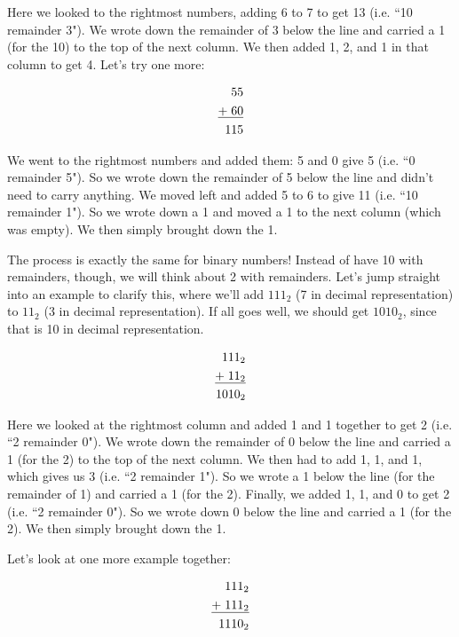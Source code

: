 Here we looked to the rightmost numbers, adding 6 to 7 to get 13 (i.e. ``10 remainder 3"). We wrote down the remainder of 3 below the line and carried a 1 (for the 10) to the top of the next column. We then added 1, 2, and 1 in that column to get 4. Let's try one more:

\begin{align*}
55&\\
\underline{+\hspace{1mm}60}&\\
115&\\
\end{align*}

We went to the rightmost numbers and added them: 5 and 0 give 5 (i.e. ``0 remainder 5"). So we wrote down the remainder of 5 below the line and didn't need to carry anything. We moved left and added 5 to 6 to give 11 (i.e. ``10 remainder 1"). So we wrote down a 1 and moved a 1 to the next column (which was empty). We then simply brought down the 1. 

The process is exactly the same for binary numbers! Instead of have 10 with remainders, though, we will think about 2 with remainders. Let's jump straight into an example to clarify this, where we'll add $111_{2}$ (7 in decimal representation) to $11_{2}$ (3 in decimal representation). If all goes well, we should get $1010_{2}$, since that is 10 in decimal representation. 

\begin{align*}
111_{2}&\\
\underline{+\hspace{1mm}11_{2}}&\\
1010_2&\\
\end{align*}

Here we looked at the rightmost column and added 1 and 1 together to get 2 (i.e. ``2 remainder 0"). We wrote down the remainder of 0 below the line and carried a 1 (for the 2) to the top of the next column. We then had to add 1, 1, and 1, which gives us 3 (i.e. ``2 remainder 1"). So we wrote a 1 below the line (for the remainder of 1) and carried a 1 (for the 2). Finally, we added 1, 1, and 0 to get 2 (i.e. ``2 remainder 0"). So we wrote down 0 below the line and carried a 1 (for the 2). We then simply brought down the 1. 

Let's look at one more example together: 

\begin{align*}
111_{2}&\\
\underline{+\hspace{1mm}111_{2}}&\\
1110_2&\\
\end{align*}

